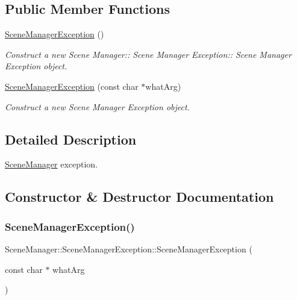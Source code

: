 \subsection*{Public Member Functions}
\begin{DoxyCompactItemize}
\item 
\mbox{\label{class_scene_manager_1_1_scene_manager_exception_aa72b4fc6eca78c1187a8e73270601790}} 
\hyperlink{class_scene_manager_1_1_scene_manager_exception_aa72b4fc6eca78c1187a8e73270601790}{Scene\+Manager\+Exception} ()
\begin{DoxyCompactList}\small\item\em Construct a new Scene Manager\+:\+: Scene Manager Exception\+:\+: Scene Manager Exception object. \end{DoxyCompactList}\item 
\hyperlink{class_scene_manager_1_1_scene_manager_exception_a70b0019b3f70f5db9d67dd53f505c1ef}{Scene\+Manager\+Exception} (const char $\ast$what\+Arg)
\begin{DoxyCompactList}\small\item\em Construct a new Scene Manager Exception object. \end{DoxyCompactList}\end{DoxyCompactItemize}


\subsection{Detailed Description}
\hyperlink{class_scene_manager}{Scene\+Manager} exception. 

\subsection{Constructor \& Destructor Documentation}
\mbox{\label{class_scene_manager_1_1_scene_manager_exception_a70b0019b3f70f5db9d67dd53f505c1ef}} 
\subsubsection{\texorpdfstring{Scene\+Manager\+Exception()}{SceneManagerException()}}
{\footnotesize\ttfamily Scene\+Manager\+::\+Scene\+Manager\+Exception\+::\+Scene\+Manager\+Exception (\begin{DoxyParamCaption}\item[{const char $\ast$}]{what\+Arg }\end{DoxyParamCaption})\hspace{0.3cm}{\ttfamily [explicit]}}



